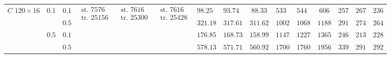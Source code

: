 \begin{table}[t]
{\begin{tabular}{|c|c|c|c|c|c|g|h|c|g|h|c|g|h|c|}
       &  & $0.1$ &  &   &   & $98.25$ & $93.74$ & $88.33$ & $533$ & $544$ & $606$ & $257$ & $267$ & $236$\\ \hhline{|~|~|-|~|~|~|-|-|-|-|-|-|-|-|-|}
       & & $0.5$ & & & & $321.18$ & $317.61$ & $311.62$ & $1002$ & $1068$ & $1188$ & $291$ & $274$ & $264$\\ \hhline{|~|-|-|~|~|~|-|-|-|-|-|-|-|-|-|}
       &  & $0.1$ & & & & $176.85$ & $168.73$ & $158.99$ & $1147$ & $1227$ & $1365$ & $246$ & $213$ & $228$\\ \hhline{|~|~|-|~|~|~|-|-|-|-|-|-|-|-|-|}
       & & $0.5$ & & & & $578.13$ & $571.71$ & $560.92$ & $1700$ & $1760$ & $1956$ & $339$ & $291$ & $292$\\ 

      \hline
    \end{tabular}
  }
\end{table}

